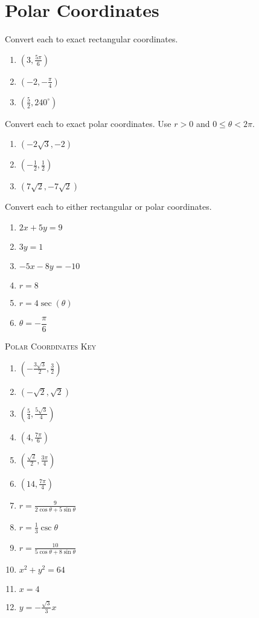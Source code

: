 \chapter{Polar Coordinates}

Convert each to exact rectangular coordinates.
\begin{enumerate}
	\item $\left(3, \frac{5\pi}{6}\right)$
    \item $\left(-2, -\frac{\pi}{4}\right)$
    \item $\left(\frac{5}{2}, 240^\circ\right)$
\end{enumerate}	\setcounter{Review}{\value{enumi}}

Convert each to exact polar coordinates. Use $r > 0$ and $0 \leq \theta < 2\pi$.
\begin{enumerate}		\setcounter{enumi}{\value{Review}}
	\item $\left(-2\sqrt{3}, -2\right)$
    \item $\left(-\frac{1}{2}, \frac{1}{2}\right)$
    \item $\left(7\sqrt{2}, -7\sqrt{2}\right)$
\end{enumerate}	\setcounter{Review}{\value{enumi}}

Convert each to either rectangular or polar coordinates.
\begin{enumerate}		\setcounter{enumi}{\value{Review}}
	\item $2x + 5y = 9$
    \item $3y = 1$
    \item $-5x - 8y = -10$
    \item $r = 8$
    \item $r = 4\sec(\theta)$
    \item $\theta = -\dfrac{\pi}{6}$
\end{enumerate}	\setcounter{Review}{\value{enumi}}

\newpage

\textsc{Polar Coordinates Key}

\begin{enumerate}
	\item $\left(-\frac{3\sqrt{3}}{2}, \frac{3}{2}\right)$
    \item $(-\sqrt{2}, \sqrt{2})$
    \item $\left(\frac{5}{4}, \frac{5\sqrt{3}}{4}\right)$
    
    \item $\left(4, \frac{7\pi}{6}\right)$
    \item $\left(\frac{\sqrt{2}}{2}, \frac{3\pi}{4}\right)$
    \item $\left(14, \frac{7\pi}{4}\right)$
    
    \item $r = \frac{9}{2\cos\theta+5\sin\theta}$
    \item $r = \frac{1}{3}\csc\theta$
    \item $r = \frac{10}{5\cos\theta+8\sin\theta}$
    \item $x^2+y^2=64$
    \item $x = 4$
    \item $y = -\frac{\sqrt{3}}{3}x$
\end{enumerate}